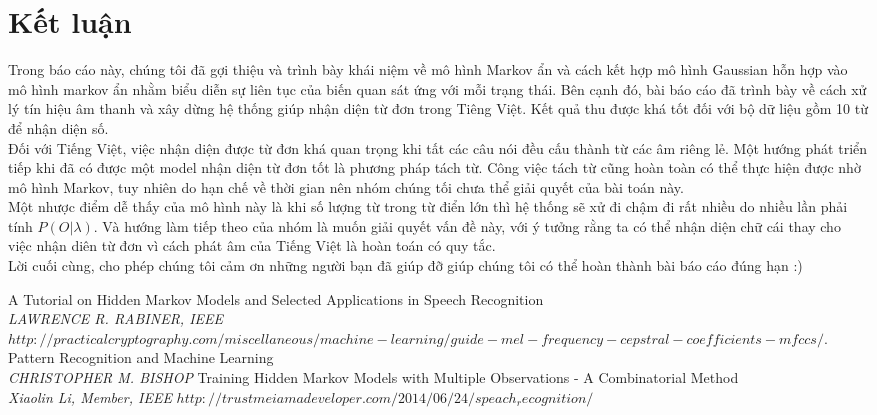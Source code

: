 \documentclass[13pt]{extreport}
\begin{document}
\chapter{Kết luận}
Trong báo cáo này, chúng tôi đã gợi thiệu và trình bày khái niệm về mô hình Markov ẩn và cách kết hợp mô hình Gaussian hỗn hợp vào mô hình markov ẩn nhằm biểu diễn sự liên tục của biến quan sát ứng với mỗi trạng thái. Bên cạnh đó, bài báo cáo đã trình bày về cách xử lý tín hiệu âm thanh và xây dừng hệ thống giúp nhận diện từ đơn trong Tiêng Việt. Kết quả thu được khá tốt đối với bộ dữ liệu gồm 10 từ để nhận diện số. \\
Đối với Tiếng Việt, việc nhận diện được từ đơn khá quan trọng khi tất các câu nói đều cấu thành từ các âm riêng lẻ. Một hướng phát triển tiếp khi đã có được một model nhận diện từ đơn tốt là phương pháp tách từ. Công việc tách từ cũng hoàn toàn có thể thực hiện được nhờ mô hình Markov, tuy nhiên do hạn chế về thời gian nên nhóm chúng tối chưa thể giải quyết của bài toán này. \\
Một nhược điểm dễ thấy của mô hình này là khi số lượng từ trong từ điển lớn thì hệ thống sẽ xử đi chậm đi rất nhiều do nhiều lần phải tính $P(O| \lambda)$. Và hướng làm tiếp theo của nhóm là muốn giải quyết vấn đề này, với ý tưởng rằng ta có thể nhận diện chữ cái thay cho việc nhận diên từ đơn vì cách phát âm của Tiếng Việt là hoàn toán có quy tắc. \\
Lời cuối cùng, cho phép chúng tôi cảm ơn những người bạn đã giúp đỡ giúp chúng tôi có thể hoàn thành bài báo cáo đúng hạn :)

\newpage
\begin{thebibliography}{12}
A Tutorial on Hidden Markov Models and Selected Applications in Speech Recognition\\
\textit{LAWRENCE R. RABINER, IEEE}
 $http://practicalcryptography.com/miscellaneous/machine-learning/guide-mel-frequency-cepstral-coefficients-mfccs/$.
Pattern Recognition and Machine Learning \\
\textit{CHRISTOPHER M. BISHOP}
Training Hidden Markov Models with Multiple
Observations - A Combinatorial Method \\
\textit{Xiaolin Li, Member, IEEE}
$http://trustmeiamadeveloper.com/2014/06/24/speach_recognition/$




\end{thebibliography}
\end{document}

